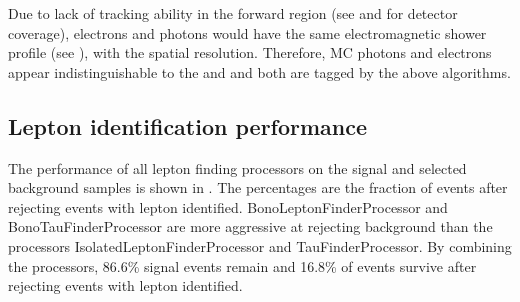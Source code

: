 Due to lack of tracking ability in the forward region (see \Section{} and \Section{} for detector coverage), electrons and photons would have the same electromagnetic shower profile (see \Section{}), with the \ECAL spatial resolution. Therefore, MC photons and electrons appear indistinguishable to the \BeamCAL and \LumiCAL and both  are tagged by the above algorithms.







\subsection{Lepton identification performance}

The performance of all lepton finding processors on the signal and selected background samples is shown in . The percentages are the fraction of events after rejecting events with lepton identified. BonoLeptonFinderProcessor and BonoTauFinderProcessor are more aggressive at rejecting background than the processors IsolatedLeptonFinderProcessor and TauFinderProcessor. By combining the processors, 86.6\% signal events remain and 16.8\% of \HepProcess{\Pep \Pem \to \Pquark\Pquark\Pquark\Pquark\Plepton\Pnu} events survive after rejecting events with lepton identified.

